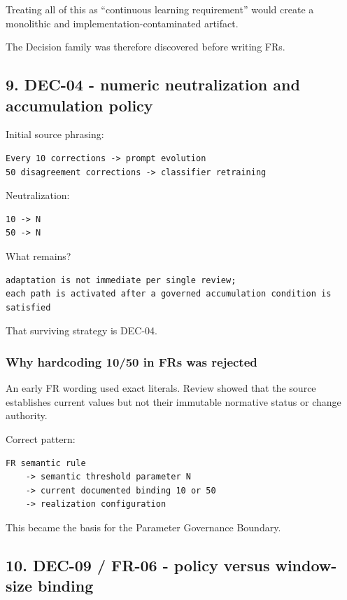 \documentclass[11pt,a4paper]{article}
\begin{document}
Treating all of this as ``continuous learning requirement'' would create
a monolithic and implementation-contaminated artifact.

The Decision family was therefore discovered before writing FRs.

\subsection{9. DEC-04 - numeric neutralization and accumulation
policy}\label{9-dec-04---numeric-neutralization-and-accumulation-policy}

Initial source phrasing:

\begin{verbatim}
Every 10 corrections -> prompt evolution
50 disagreement corrections -> classifier retraining
\end{verbatim}

Neutralization:

\begin{verbatim}
10 -> N
50 -> N
\end{verbatim}

What remains?

\begin{verbatim}
adaptation is not immediate per single review;
each path is activated after a governed accumulation condition is satisfied
\end{verbatim}

That surviving strategy is DEC-04.

\subsubsection{Why hardcoding 10/50 in FRs was
rejected}\label{why-hardcoding-1050-in-frs-was-rejected}

An early FR wording used exact literals. Review showed that the source
establishes current values but not their immutable normative status or
change authority.

Correct pattern:

\begin{verbatim}
FR semantic rule
    -> semantic threshold parameter N
    -> current documented binding 10 or 50
    -> realization configuration
\end{verbatim}

This became the basis for the Parameter Governance Boundary.

\subsection{10. DEC-09 / FR-06 - policy versus window-size
binding}\label{10-dec-09--fr-06---policy-versus-window-size-binding}
\end{document}
